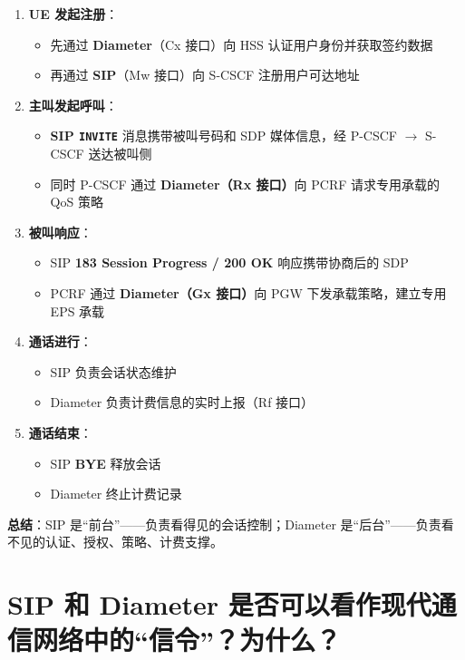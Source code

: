 \documentclass[12pt,a4paper]{ctexart}
\newcommand{\code}[1]{\texttt{#1}}
\begin{document}
\begin{enumerate}
  \item \textbf{UE 发起注册}：
    \begin{itemize}
      \item 先通过 \textbf{Diameter}（Cx 接口）向 HSS 认证用户身份并获取签约数据
      \item 再通过 \textbf{SIP}（Mw 接口）向 S-CSCF 注册用户可达地址
    \end{itemize}
  \item \textbf{主叫发起呼叫}：
    \begin{itemize}
      \item \textbf{SIP \code{INVITE}} 消息携带被叫号码和 SDP 媒体信息，经 P-CSCF $\rightarrow$ S-CSCF 送达被叫侧
      \item 同时 P-CSCF 通过 \textbf{Diameter（Rx 接口）}向 PCRF 请求专用承载的 QoS 策略
    \end{itemize}
  \item \textbf{被叫响应}：
    \begin{itemize}
      \item SIP \textbf{183 Session Progress / 200 OK} 响应携带协商后的 SDP
      \item PCRF 通过 \textbf{Diameter（Gx 接口）}向 PGW 下发承载策略，建立专用 EPS 承载
    \end{itemize}
  \item \textbf{通话进行}：
    \begin{itemize}
      \item SIP 负责会话状态维护
      \item Diameter 负责计费信息的实时上报（Rf 接口）
    \end{itemize}
  \item \textbf{通话结束}：
    \begin{itemize}
      \item SIP \textbf{BYE} 释放会话
      \item Diameter 终止计费记录
    \end{itemize}
\end{enumerate}

\textbf{总结}：SIP 是“前台”——负责看得见的会话控制；Diameter 是“后台”——负责看不见的认证、授权、策略、计费支撑。

\section{SIP 和 Diameter 是否可以看作现代通信网络中的“信令”？为什么？}
\end{document}
